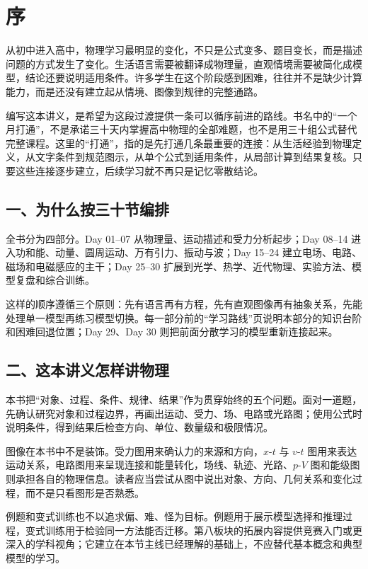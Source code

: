 \chapter*{序}

从初中进入高中，物理学习最明显的变化，不只是公式变多、题目变长，而是描述问题的方式发生了变化。生活语言需要被翻译成物理量，直观情境需要被简化成模型，结论还要说明适用条件。许多学生在这个阶段感到困难，往往并不是缺少计算能力，而是还没有建立起从情境、图像到规律的完整通路。

编写这本讲义，是希望为这段过渡提供一条可以循序前进的路线。书名中的“一个月打通”，不是承诺三十天内掌握高中物理的全部难题，也不是用三十组公式替代完整课程。这里的“打通”，指的是先打通几条最重要的连接：从生活经验到物理定义，从文字条件到规范图示，从单个公式到适用条件，从局部计算到结果复核。只要这些连接逐步建立，后续学习就不再只是记忆零散结论。

\section*{一、为什么按三十节编排}

全书分为四部分。Day 01--07 从物理量、运动描述和受力分析起步；Day 08--14 进入功和能、动量、圆周运动、万有引力、振动与波；Day 15--24 建立电场、电路、磁场和电磁感应的主干；Day 25--30 扩展到光学、热学、近代物理、实验方法、模型复盘和综合训练。

这样的顺序遵循三个原则：先有语言再有方程，先有直观图像再有抽象关系，先能处理单一模型再练习模型切换。每一部分前的“学习路线”页说明本部分的知识台阶和困难回退位置；Day 29、Day 30 则把前面分散学习的模型重新连接起来。

\section*{二、这本讲义怎样讲物理}

本书把“对象、过程、条件、规律、结果”作为贯穿始终的五个问题。面对一道题，先确认研究对象和过程边界，再画出运动、受力、场、电路或光路图；使用公式时说明条件，得到结果后检查方向、单位、数量级和极限情况。

图像在本书中不是装饰。受力图用来确认力的来源和方向，$x$-$t$ 与 $v$-$t$ 图用来表达运动关系，电路图用来呈现连接和能量转化，场线、轨迹、光路、$p$-$V$ 图和能级图则承担各自的物理信息。读者应当尝试从图中说出对象、方向、几何关系和变化过程，而不是只看图形是否熟悉。

例题和变式训练也不以追求偏、难、怪为目标。例题用于展示模型选择和推理过程，变式训练用于检验同一方法能否迁移。第八板块的拓展内容提供竞赛入门或更深入的学科视角；它建立在本节主线已经理解的基础上，不应替代基本概念和典型模型的学习。

